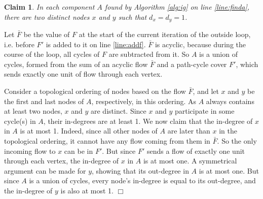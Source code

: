 \documentclass[11pt]{article}
\newcommand{\qed}{\hspace*{\fill}$\Box$}
\newtheorem{claim}[theorem]{Claim}
\newenvironment{proof}[1][Proof. ]{\noindent {\bf #1 }}{\qed}
\begin{document}
\begin{claim} \label{claim:xy}
In each component $A$ found by  Algorithm \ref{alg:ig} on line \ref{line:finda}, there are two distinct nodes $x$ and $y$ such that $d_x = d_y = 1$.
\end{claim}
\begin{proof}
Let $\bar{F}$ be the value of $F$ at the start of the current iteration of the outside loop, 
i.e. before $F'$ is added to it on line \ref{line:addf}. $\bar{F}$ is acyclic, because during 
the course of the loop, all cycles of $F$ are subtracted from it. So $A$ is a union of cycles, 
formed from the sum of an acyclic flow $\bar{F}$ and a path-cycle cover $F'$, which sends exactly 
one unit of flow through each vertex. 

Consider a topological ordering of nodes based on the flow $\bar{F}$, and let $x$ and $y$ be 
the first and last nodes of $A$, respectively, in this ordering. As $A$ always contains at least 
two nodes, $x$ and $y$ are distinct. Since $x$ and $y$ participate in some cycle(s) in $A$, their 
in-degrees are at least 1. We now claim that the in-degree of $x$ in $A$ is at most 1.  Indeed, 
since all other nodes of $A$ are later than $x$ in the topological ordering, it cannot have any 
flow coming from them in $\bar{F}$. So the only incoming flow to $x$ can be in $F'$.  But since 
$F'$ sends a flow of exactly one unit through each vertex, the in-degree of $x$ in $A$ is at most 
one.  A symmetrical argument can be made for $y$, showing that its out-degree in $A$ is at most 
one.  But since $A$ is a union of cycles, every node's in-degree is equal to its out-degree, and 
the in-degree of $y$ is also at most 1.
\end{proof}
\end{document}
